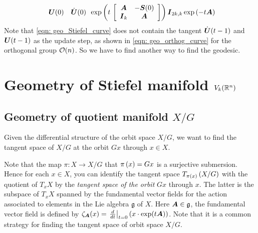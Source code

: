 \documentclass[11pt]{article}
\begin{document}
\begin{enumerate}
\begin{align}
{\begin{array}{cc}
\boldsymbol{U}(0)& \dot{\boldsymbol{U}}(0)
\end{array} }\exp\left(t\,\left[\begin{array}{cc}
\boldsymbol{A} & -\boldsymbol{S}(0) \\ 
\boldsymbol{I}_{k} & \boldsymbol{A}
\end{array} \right] \right)\boldsymbol{I}_{2k,k}\exp\left(-t\boldsymbol{A}\right) \label{eqn: geo_Stiefel_curve}
\end{align}
Note that \eqref{eqn: geo_Stiefel_curve} does not contain the tangent $\dot{\boldsymbol{U}}(t-1)$ and $\boldsymbol{U}(t-1)$ as the update step, as shown in \eqref{eqn: geo_orthog_curve} for the orthogonal group ${\mathcal O}(n)$. So we have to find another way to find the geodesic. %
\end{enumerate}


 

%
%
%



\newpage
\section{Geometry of Stiefel manifold $V_{k}({\mathbb R}^{n})$}
\subsection{Geometry of quotient manifold $X/G$}
Given the differential structure of the orbit space $X/G$, we want to find the tangent space of $X/G$ at the orbit $Gx$ through $x\in X$. 

Note that the map $\pi: X \to X/G$ that $\pi\left(x\right) = Gx$ is a surjective submersion. Hence for each $x\in X$, you can identify the tangent space $T_{\pi(x)}\left(X/G\right)$ with the quotient of $T_{x}X$ by the \emph{tangent space of the orbit} $Gx$ through $x$.  The latter is the subspace of $T_{x}X$ spanned by the fundamental vector fields for the action associated to elements in the Lie algebra $\mathfrak{g}$ of $X$. Here  $\boldsymbol{A}\in \mathfrak{g}$, the fundamental vector field is defined by $\zeta_{\boldsymbol{A}}(x)= \left.{\frac{d}{dt}}\right\vert_{t=0}\left(x \cdot \exp(t\boldsymbol{A})\right)$.
Note that it is a common strategy for finding the tangent space of orbit space $X/G$.
\end{document}
